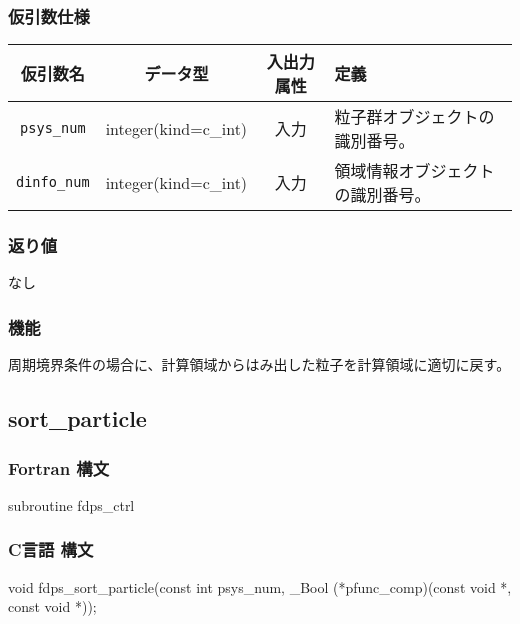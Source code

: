 \subsubsection*{仮引数仕様}
\begin{table}[h]
\begin{tabularx}{\linewidth}{cccX}
\toprule
\rowcolor{Snow2}
仮引数名 & データ型 & 入出力属性 & 定義 \\
\midrule
\texttt{psys\_num} & integer(kind=c\_int) & 入力 & 粒子群オブジェクトの識別番号。\\
\texttt{dinfo\_num} & integer(kind=c\_int) & 入力 & 領域情報オブジェクトの識別番号。\\
\bottomrule

\end{tabularx}
\end{table}

\subsubsection*{返り値}
なし

\subsubsection*{機能}
周期境界条件の場合に、計算領域からはみ出した粒子を計算領域に適切に戻す。

\clearpage

\subsection{sort\_particle}
\subsubsection*{Fortran 構文}
\begin{screen}
\begin{spverbatim}
subroutine fdps_ctrl%
\end{spverbatim}
\end{screen}

\subsubsection*{C言語 構文}
\begin{screen}
\begin{spverbatim}
void fdps_sort_particle(const int psys_num,
                        _Bool (*pfunc_comp)(const void *, const void *));
\end{spverbatim}
\end{screen}

